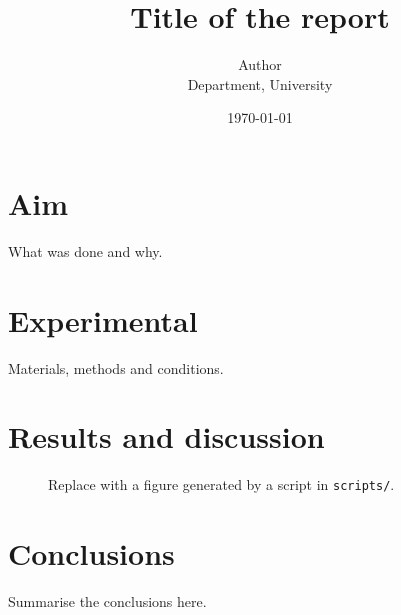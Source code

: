 \documentclass[11pt]{article}
\title{Title of the report}
\author{Author\\ \small Department, University}
\date{\today}
\begin{document}
\maketitle

\section{Aim}

What was done and why.

\section{Experimental}

Materials, methods and conditions.

\section{Results and discussion}

\begin{figure}[htbp]
  \centering
  \caption{Replace with a figure generated by a script in \texttt{scripts/}.}
  \label{fig:example}
\end{figure}

\section{Conclusions}

Summarise the conclusions here.



\end{document}
